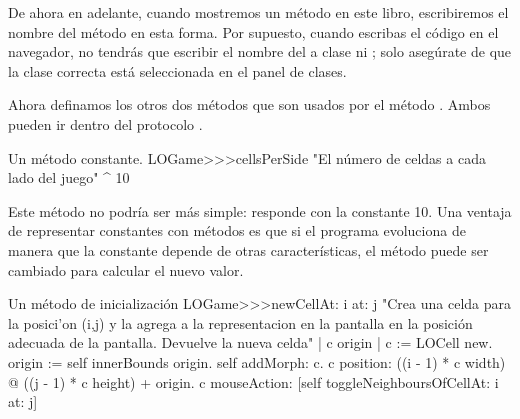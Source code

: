 \documentclass[a4paper,10pt,twoside]{book}
\begin{document}
De ahora en adelante, cuando mostremos un m\'etodo en este libro, escribiremos el nombre del m\'etodo en esta forma. Por supuesto, cuando escribas el c\'odigo en el navegador, no tendr\'as que escribir el nombre del a clase ni \ct{>>>}; solo aseg\'urate de que la clase correcta est\'a seleccionada en el panel de clases. 


Ahora definamos los otros dos m\'etodos que son usados por el m\'etodo . Ambos pueden ir dentro del protocolo .

\begin{method}[sbegamecellsperside]{Un m\'etodo constante.}
LOGame>>>cellsPerSide
   "El n\'umero de celdas a cada lado del juego"
   ^ 10
\end{method}

Este m\'etodo no podr\'ia ser m\'as simple: responde con la constante 10. Una ventaja de representar constantes con m\'etodos es que si el programa evoluciona de manera que la constante depende de otras caracter\'isticas, el m\'etodo puede ser cambiado para calcular el nuevo valor. 

\begin{method}[newCellAt:at:]{Un m\'etodo de inicializaci\'on}
LOGame>>>newCellAt: i at: j
   "Crea una celda para la posici'on (i,j) y la agrega a la representacion
   en la pantalla en la posici\'on adecuada de la pantalla. Devuelve la nueva celda"
   | c origin |
   c := LOCell new.
   origin := self innerBounds origin.
   self addMorph: c.
   c position: ((i - 1) * c width) @ ((j - 1) * c height) + origin.
   c mouseAction: [self toggleNeighboursOfCellAt: i at: j]
\end{method}
\end{document}
